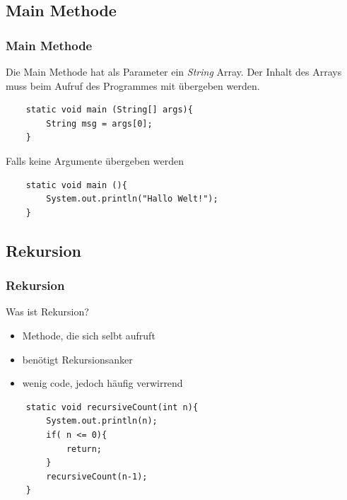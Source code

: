 \subsection{Main Methode}
\begin{frame}[fragile]
\frametitle{Main Methode}
Die Main Methode hat als Parameter ein \textit{String} Array. Der Inhalt des Arrays muss beim Aufruf des Programmes mit übergeben werden.
\begin{lstlisting}
    static void main (String[] args){
        String msg = args[0];
    }
\end{lstlisting}
Falls keine Argumente übergeben werden
\begin{lstlisting}
    static void main (){
        System.out.println("Hallo Welt!");
    }
\end{lstlisting}
\end{frame}

\subsection{Rekursion}
\begin{frame}[fragile]
	\frametitle{Rekursion}
	Was ist Rekursion?
	\begin{itemize}
		\item Methode, die sich selbt aufruft
		\item benötigt Rekursionsanker
		\item wenig code, jedoch häufig verwirrend
	\end{itemize}
\begin{lstlisting}
    static void recursiveCount(int n){
        System.out.println(n);
        if( n <= 0){
            return;
        }
        recursiveCount(n-1);
    }
\end{lstlisting}
\end{frame}


